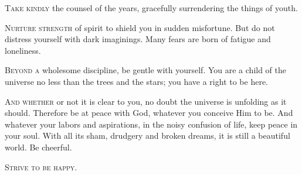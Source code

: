 \documentclass[fontsize=9, a5paper]{scrbook}
\begin{document}
\begin{poem}
	\begin{stanza}
		\textsc{Take kindly} the counsel of the years, \verseline
			\verseindent gracefully surrendering the things of youth.
	\end{stanza}
	
	\begin{stanza}
		\textsc{Nurture strength} of spirit to shield you \verseline
			\verseindent in sudden misfortune. \verseline
		But do not distress yourself \verseline
			\verseindent with dark imaginings. \verseline
		Many fears are born of fatigue \verseline
			\verseindent and loneliness.
	\end{stanza}
	
	\begin{stanza}
		\textsc{Beyond a} wholesome discipline, be gentle with yourself. \verseline
		You are a child of the universe \verseline
			\verseindent no less than the trees and the stars; \verseline
			\verseindent \verseindent you have a right to be here.
	\end{stanza}

	\begin{stanza}
		\textsc{And whether} or not it is clear to you, \verseline
			\verseindent no doubt the universe is unfolding as it should. \verseline
		Therefore be at peace with God, \verseline
			\verseindent whatever you conceive Him to be. \verseline
		And whatever your labors and aspirations, \verseline
			\verseindent in the noisy confusion of life, \verseline
				\verseindent\verseindent keep peace in your soul. \verseline
		With all its sham, drudgery and broken dreams, \verseline
			\verseindent it is still a beautiful world. \verseline
		Be cheerful. 
	\end{stanza}

	\begin{stanza}
		\textsc{Strive to be happy.}
	\end{stanza}
\end{poem}

\pagebreak
\end{document}
